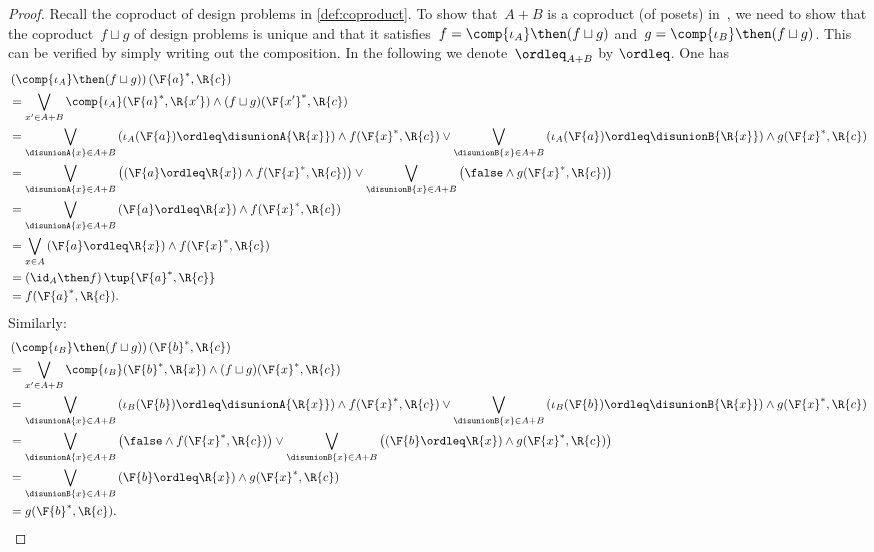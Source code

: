 \begin{proof}
    Recall the coproduct of design problems in \cref{def:coproduct}. To show that~$A+B$ is a coproduct (of posets) in~\DP, we need to show that the coproduct~$f \sqcup g$ of design problems is unique and that it satisfies~$f = \comp{\iota_A} \then (f \sqcup g)$ and~$g = \comp{\iota_B} \then (f \sqcup g)$. This can be verified by simply writing out the composition. In the following we denote~$\ordleq_{A+B}$ by $\ordleq$. One has
    \begin{equation}
        \begin{aligned}
            &\left(\comp{\iota_A}\then (f\sqcup g)\right)(\F{a}^*,\R{c})\\&=\bigvee_{x' \in A+B}\comp{\iota_A}(\F{a}^*,\R{x'})\wedge (f\sqcup g)(\F{x'}^*,\R{c})\\
            &=\bigvee_{\disunionA{x} \in A+B}
            \left(\iota_A(\F{a})\ordleq\disunionA{\R{x}}\right)\wedge  f(\F{x}^*,\R{c})  \vee \bigvee_{\disunionB{x} \in A+B}
            \left(\iota_A(\F{a})\ordleq \disunionB{\R{x}}\right)\wedge  g(\F{x}^*,\R{c})\\
            &=\bigvee_{\disunionA{x} \in A+B}
            \left( \left(\F{a}\ordleq \R{x}\right) \wedge  f(\F{x}^*,\R{c})\right) \vee \bigvee_{\disunionB{x} \in A+B}
            \left( \false \wedge  g(\F{x}^*,\R{c}) \right)\\
            &=\bigvee_{\disunionA{x} \in A+B} \left(\F{a}\ordleq \R{x}\right) \wedge  f(\F{x}^*,\R{c})\\
            &=\bigvee_{x\in A}\left( \F{a}\ordleq \R{x}\right) \wedge f(\F{x}^*,\R{c})\\
            &=\left( \id_A \then f\right)\tup{\F{a}^*,\R{c}}\\
            &=f(\F{a}^*,\R{c}).
        \end{aligned}
    \end{equation}
    Similarly:
    \begin{equation}
        \begin{aligned}
            &\left(\comp{\iota_B}\then (f\sqcup g)\right)(\F{b}^*,\R{c})\\&=\bigvee_{x' \in A+B}\comp{\iota_B}(\F{b}^*,\R{x})\wedge (f\sqcup g)(\F{x}^*,\R{c})\\
            &=\bigvee_{\disunionA{x} \in A+B}
            \left(\iota_B(\F{b})\ordleq\disunionA{\R{x}}\right)\wedge  f(\F{x}^*,\R{c})  \vee \bigvee_{\disunionB{x} \in A+B}
            \left(\iota_B(\F{b})\ordleq \disunionB{\R{x}}\right)\wedge  g(\F{x}^*,\R{c})\\
            &=\bigvee_{\disunionA{x} \in A+B}
            \left(\false \wedge  f(\F{x}^*,\R{c})\right) \vee \bigvee_{\disunionB{x} \in A+B}
            \left(\left(\F{b}\ordleq \R{x}\right) \wedge  g(\F{x}^*,\R{c}) \right)\\
            &=\bigvee_{\disunionB{x} \in A+B} \left(\F{b}\ordleq \R{x}\right) \wedge  g(\F{x}^*,\R{c})\\
            &=g(\F{b}^*,\R{c}).
        \end{aligned}
    \end{equation}


\end{proof}
